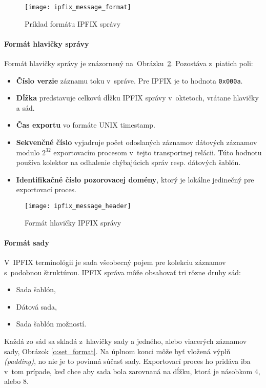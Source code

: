 \begin{figure}[ht!]
\centering
\texttt{[image: ipfix\_message\_format]}
\caption{Príklad formátu IPFIX správy}\label{o:ipfix_message_format}
\end{figure}



\paragraph{Formát hlavičky správy}

Formát hlavičky správy je znázornený na~Obrázku~\ref{o:ipfix_message_header}. Pozostáva z~piatich poli:
\begin{itemize}
 \item \textbf{Číslo verzie} záznamu toku v~správe. Pre IPFIX je to hodnota \verb|0x000a|.
 \item \textbf{Dĺžka} predstavuje celkovú dĺžku IPFIX správy v~oktetoch, vrátane hlavičky a sád. 
 \item \textbf{Čas exportu} vo formáte UNIX timestamp. 
 \item \textbf{Sekvenčné číslo} vyjadruje počet odoslaných záznamov dátových záznamov modulo $2^{32}$  
 exportovacím procesom v~tejto transportnej relácii. Túto hodnotu používa kolektor na odhalenie chýbajúcich 
 správ resp. dátových šablón.
 \item \textbf{Identifikačné číslo pozorovacej domény}, ktorý je lokálne jedinečný pre exportovací proces.
 \end{itemize}
 
\begin{figure}[ht!]
\centering
\texttt{[image: ipfix\_message\_header]}
\caption{Formát hlavičky IPFIX správy}\label{o:ipfix_message_header}
\end{figure}



\paragraph{Formát sady}

V~IPFIX terminológii je sada všeobecný pojem pre kolekciu záznamov s~podobnou štruktúrou. 
IPFIX správa môže obsahovať tri rôzne druhy sád:
\begin{itemize}
 \item Sada šablón,
 \item Dátová sada,
 \item Sada šablón možností.
\end{itemize}
Každá zo sád sa skladá z~hlavičky sady a jedného, alebo viacerých záznamov sady, Obrázok \ref{o:set_format}. 
Na úplnom konci môže byť vložená výplň \emph{(padding)}, no nie je to povinná súčasť sady. Exportovací proces ho pridáva 
iba v~tom prípade, keď chce aby sada bola zarovnaná na dĺžku, ktorá je násobkom 4, alebo 8.


